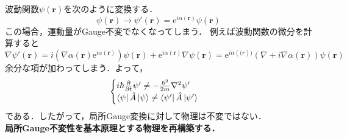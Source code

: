 \documentclass{report}
\begin{document}
  波動関数$\psi(\bm{r})$を次のように変換する．
  \begin{equation}
    \psi(\bm{r})\to\psi'(\bm{r})=\mathrm{e}^{i\alpha(\bm{r})}\psi(\bm{r})
  \end{equation}
  この場合，運動量がGauge不変でなくなってしまう．
  例えば波動関数の微分を計算すると
  \begin{equation}
    \nabla\psi'(\bm{r})=i(\nabla\alpha(\bm{r})\mathrm{e}^{i\alpha(\bm{r})})\psi(\bm{r})+\mathrm{e}^{i\alpha(\bm{r})}\nabla\psi(\bm{r})=\mathrm{e}^{i\alpha(\bm(r))}(\nabla+i\nabla\alpha(\bm{r}))\psi(\bm{r}) 
  \end{equation}
  余分な項が加わってしまう．よって，
  \begin{equation}
    \begin{cases}
      i\hbar\frac{\partial}{\partial t}\psi'\ne -\frac{\hbar^2}{2m}\nabla^2\psi'\\
      \bra{\psi}\hat{A}\ket{\psi}\ne\bra{\psi'}\hat{A}\ket{\psi'}
    \end{cases}
  \end{equation}
  である．したがって，局所Gauge変換に対して物理は不変ではない．\\
  \textbf{局所Gauge不変性を基本原理とする物理を再構築する．}
\end{document}
